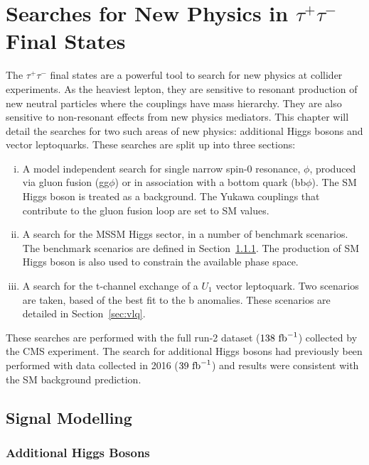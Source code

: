 \chapter{\texorpdfstring{Searches for New Physics in $\tau^+\tau^-$ Final States}{Search for new physics in tautau final states}}
\label{sec:bsm_H_to_tau_tau_analysis}
 
The $\tau^+\tau^-$ final states are a powerful tool to search for new physics at collider experiments. 
As the heaviest lepton, they are sensitive to resonant production of new neutral particles where the couplings have mass hierarchy.
They are also sensitive to non-resonant effects from new physics mediators. 
This chapter will detail the searches for two such areas of new physics: additional Higgs bosons and vector leptoquarks.
These searches are split up into three sections: 
\begin{enumerate}[i)]
  \item A model independent search for single narrow spin-0 resonance, $\phi$, produced via gluon fusion (gg$\phi$) or in association with a bottom quark (bb$\phi$). The SM Higgs boson is treated as a background. The Yukawa couplings that contribute to the gluon fusion loop are set to SM values.
   \item A search for the MSSM Higgs sector, in a number of benchmark scenarios. The benchmark scenarios are defined in Section~\ref{sec:additional_higgs_bosons}. The production of SM Higgs boson is also used to constrain the available phase space.
  \item A search for the t-channel exchange of a $U_{1}$ vector leptoquark. Two scenarios are taken, based of the best fit to the b anomalies. These scenarios are detailed in Section~\ref{sec:vlq}.
\end{enumerate}

These searches are performed with the full run-2 dataset ($138 \text{ fb}^{-1}$) collected by the CMS experiment. 
The search for additional Higgs bosons had previously been performed with data collected in 2016 ($39 \text{ fb}^{-1}$) and results were consistent with the SM background prediction.
 
\section{Signal Modelling} 
 
\subsection{Additional Higgs Bosons} 
\label{sec:additional_higgs_bosons} 
 
